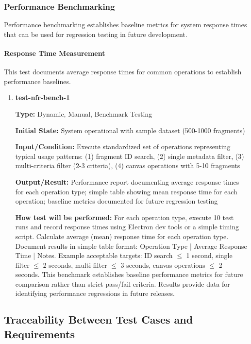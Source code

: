 \documentclass[12pt, titlepage]{article}
\begin{document}
\subsubsection{Performance Benchmarking}

Performance benchmarking establishes baseline metrics for system response times that can be used for regression testing in future development.

\paragraph{Response Time Measurement}

This test documents average response times for common operations to establish performance baselines.

\begin{enumerate}

\item \textbf{test-nfr-bench-1}

\textbf{Type:} Dynamic, Manual, Benchmark Testing

\textbf{Initial State:} System operational with sample dataset (500-1000 fragments)

\textbf{Input/Condition:} Execute standardized set of operations representing typical usage patterns: (1) fragment ID search, (2) single metadata filter, (3) multi-criteria filter (2-3 criteria), (4) canvas operations with 5-10 fragments

\textbf{Output/Result:} Performance report documenting average response times for each operation type; simple table showing mean response time for each operation; baseline metrics documented for future regression testing

\textbf{How test will be performed:} For each operation type, execute 10 test runs and record response times using Electron dev tools or a simple timing script. Calculate average (mean) response time for each operation type. Document results in simple table format: Operation Type | Average Response Time | Notes. Example acceptable targets: ID search $\leq$ 1 second, single filter $\leq$ 2 seconds, multi-filter $\leq$ 3 seconds, canvas operations $\leq$ 2 seconds. This benchmark establishes baseline performance metrics for future comparison rather than strict pass/fail criteria. Results provide data for identifying performance regressions in future releases.

\end{enumerate}


\newpage
\subsection{Traceability Between Test Cases and Requirements}
\end{document}
